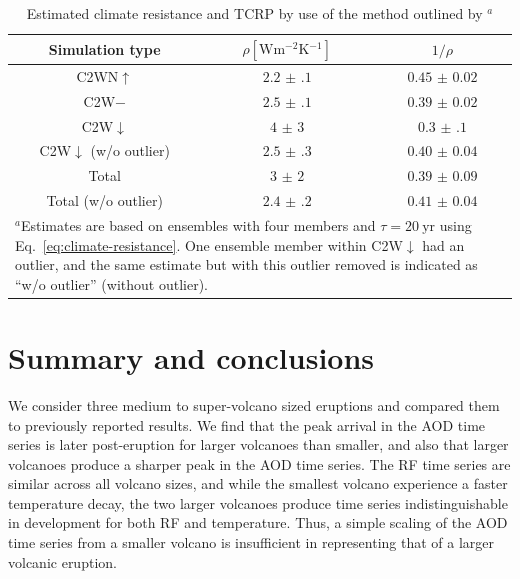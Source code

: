 \documentclass[draft]{agujournal2019}
\newcommand{\cwmp}{C2W\(-\)}
\newcommand{\cwm}{C2W\(\downarrow\)}
\newcommand{\cws}{C2WN\(\uparrow\)}
\begin{document}
\begin{table}
  \centering

  \caption{Estimated climate resistance and TCRP by use of the method outlined by
  \(^{a}\)}\label{tab:trcp}%
  \begin{tabular}{ccc}
    \toprule
    Simulation type          & \(\rho [\si{\watt\metre^{-2}\kelvin^{-1}}]\) & \(1/\rho\)        \\
    \midrule
    \cws{}               & \(\num{2.2(1)}\)                             & \(\num{0.45(2)}\) \\
    \cwmp{}              & \(\num{2.5(1)}\)                             & \(\num{0.39(2)}\) \\
    \cwm{}               & \(\num{4(3)}\)                               & \(\num{0.3(1)}\)  \\
    \cwm{} (w/o outlier) & \(\num{2.5(3)}\)                             & \(\num{0.40(4)}\) \\
    Total                    & \(\num{3(2)}\)                               & \(\num{0.39(9)}\) \\
    Total (w/o outlier)      & \(\num{2.4(2)}\)                             & \(\num{0.41(4)}\) \\
    \toprule
    \multicolumn{3}{l}{\parbox{\linewidth}{\(^{a}\)Estimates are based on ensembles with four members and \(\tau
    =\SI{20}{\mathrm{yr}}\) using Eq.~\ref{eq:climate-resistance}. One ensemble member
    within \cwm{} had an outlier, and the same estimate but with this outlier removed is
indicated as ``w/o outlier'' (without outlier).}} \\
  \end{tabular}
\end{table}


\section{Summary and conclusions}\label{sec:conclusions}

We consider three medium to super-volcano sized eruptions and compared them to
previously reported results. We find that the peak arrival in the AOD time series
is later post-eruption for larger volcanoes than smaller, and also that larger volcanoes
produce a sharper peak in the AOD time series. The RF time series are
similar across all volcano sizes, and while the smallest volcano experience a faster
temperature decay, the two larger volcanoes produce time series indistinguishable in
development for both RF and temperature. Thus, a simple scaling of the AOD
time series from a smaller volcano is insufficient in representing that of a larger
volcanic eruption.
\end{document}
